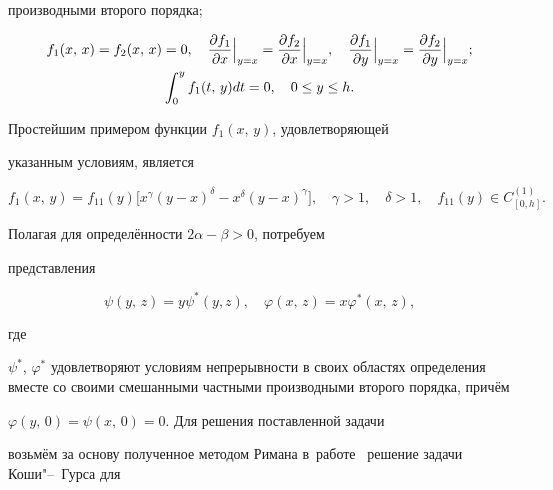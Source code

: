 \begin{task}
производными второго порядка{\rm;}

\begin{gather}

f_1(x,\,x)=f_2(x,\,x)=0, \quad 

\frac{\partial f_1}{\partial x}\Big|_{y=x} =

\frac{\partial f_2}{\partial x}\Big|_{y=x}, \quad

\frac{\partial f_1}{\partial y}\Big|_{y=x} =

\frac{\partial f_2}{\partial y}\Big|_{y=x} ; \label{rod9}\\

\notag \int _0^y f_1(t,\,y)dt=0, \quad 0\leq y\leq h.

\end{gather}

\end{task}



\begin{remark}

Простейшим примером функции $f_1(x,\,y)$, удовлетворяющей

указанным условиям, является

$$

f_1(x,\,y)=f_{11}(y)\bigl[x^\gamma(y-x)^\delta-x^\delta(y-x)^\gamma\bigr],

\quad \gamma>1, \quad \delta>1, \quad f_{11}(y)\in

C^{(1)}_{[0,h]}.

$$

\end{remark}



Полагая для определённости $2\alpha-\beta>0$, потребуем

представления

\begin{equation}

\psi(y,\,z)=y\psi^*(y,z), \quad \varphi(x,\,z)=x\varphi^*(x,\,z),

\label{rod10}

\end{equation}

где 

$\psi^*$, $\varphi^*$ удовлетворяют условиям непрерывности в своих областях определения вместе со своими смешанными частными производными второго порядка, причём

$\varphi(y,\,0)=\psi(x,\,0)=0$. Для решения поставленной задачи

возьмём за основу полученное методом Римана в~работе~\cite{rodlit1} решение задачи Коши"--~Гурса для

